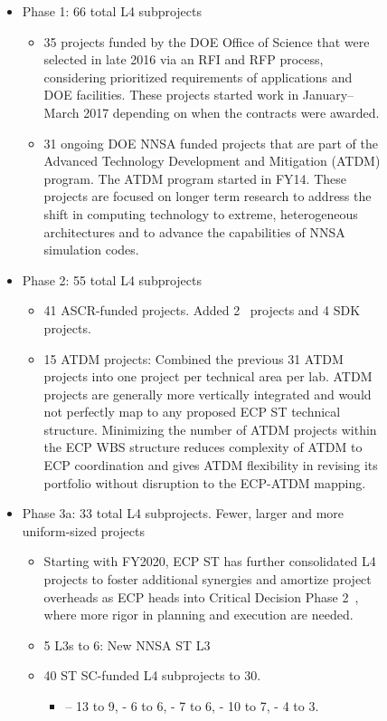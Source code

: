 \begin{figure}
\begin{mdframed}
\begin{itemize}
\item Phase 1: 66 total L4 subprojects
\begin{itemize}
\item 35 projects funded by the DOE Office of Science that were selected in late 2016 via an RFI and RFP process, considering prioritized requirements of applications and DOE facilities. 
These projects started work in January–March 2017 depending on when the contracts were awarded.
\item 31 ongoing DOE NNSA funded projects that are part of the Advanced Technology Development and Mitigation (ATDM) program. The ATDM program started in FY14.  These projects are focused on longer term research to address the shift in computing technology to extreme, heterogeneous architectures and to advance the capabilities of NNSA simulation codes.
\end{itemize}
\item Phase 2: 55 total L4 subprojects
\begin{itemize}
\item 41 ASCR-funded projects.  Added  2 \ecosystem\ projects and 4 SDK projects.
\item 15 ATDM projects: Combined the previous 31 ATDM projects into one project per technical area per lab.  ATDM projects are generally more vertically integrated and would not perfectly map to any proposed ECP ST technical structure.  Minimizing the number of ATDM projects within the ECP WBS structure reduces complexity of ATDM to ECP coordination and gives ATDM flexibility in revising its portfolio without disruption to the ECP-ATDM mapping.
\end{itemize}
\item Phase 3a: 33 total L4 subprojects.  Fewer, larger and more uniform-sized projects
\begin{itemize}
	\item Starting with FY2020, ECP ST has further consolidated L4 projects to foster additional synergies and amortize project overheads as ECP heads into Critical Decision Phase 2~\cite{413.3B}, where more rigor in planning and execution are needed.
	\item 5 L3s to 6: New NNSA ST L3
	\item 40 ST SC-funded L4 subprojects to 30.
	\begin{itemize}
	\item \pmr – 13 to 9, \tools - 6 to 6, \mathlibs - 7 to 6, \dataviz - 10 to 7, \ecosystem - 4 to 3.

\end{itemize}
\end{itemize}
\end{itemize}
\end{mdframed}
\end{figure}
